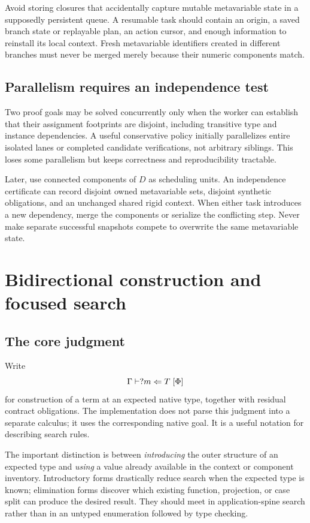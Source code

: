 Avoid storing closures that accidentally capture mutable metavariable state in a supposedly persistent queue. A resumable task should contain an origin, a saved branch state or replayable plan, an action cursor, and enough information to reinstall its local context. Fresh metavariable identifiers created in different branches must never be merged merely because their numeric components match.

\subsection{Parallelism requires an independence test}

Two proof goals may be solved concurrently only when the worker can establish that their assignment footprints are disjoint, including transitive type and instance dependencies. A useful conservative policy initially parallelizes entire isolated lanes or completed candidate verifications, not arbitrary siblings. This loses some parallelism but keeps correctness and reproducibility tractable.

Later, use connected components of $D$ as scheduling units. An independence certificate can record disjoint owned metavariable sets, disjoint synthetic obligations, and an unchanged shared rigid context. When either task introduces a new dependency, merge the components or serialize the conflicting step. Never make separate successful snapshots compete to overwrite the same metavariable state.

\section{Bidirectional construction and focused search}
\label{sec:rules}

\subsection{The core judgment}

Write
\[
 \Gamma\vdash ?m\Leftarrow T\;[\Phi]
\]
for construction of a term at an expected native type, together with residual contract obligations. The implementation does not parse this judgment into a separate calculus; it uses the corresponding native goal. It is a useful notation for describing search rules.

The important distinction is between \emph{introducing} the outer structure of an expected type and \emph{using} a value already available in the context or component inventory. Introductory forms drastically reduce search when the expected type is known; elimination forms discover which existing function, projection, or case split can produce the desired result. They should meet in application-spine search rather than in an untyped enumeration followed by type checking.

